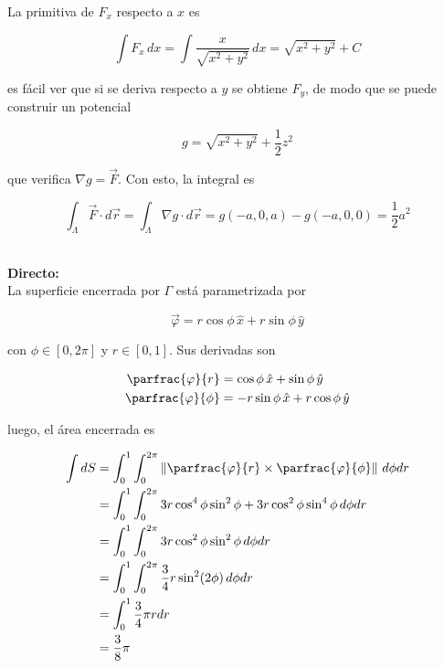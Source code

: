 La primitiva de $F_x$ respecto a $x$ es

\[\int F_x\,dx=\int\frac{x}{\sqrt{x^2+y^2}}\,dx=
\sqrt{x^2+y^2}+C\]

es fácil ver que si se deriva respecto a $y$ se obtiene $F_y$, de modo que se puede construir un potencial

\[g = \sqrt{x^2+y^2}+\frac{1}{2}z^2\]

que verifica $\nabla g=\Vec{F}$. Con esto, la integral es

\[\int_\Lambda\Vec{F}\cdot d\Vec{r}=
\int_\Lambda\nabla g\cdot d\Vec{r}=g(-a,0,a)-g(-a,0,0)=\frac{1}{2}a^2\]

\bigbreak
{}\\

\textbf{Directo:}\\

La superficie encerrada por $\Gamma$ está parametrizada por

\[\Vec{\varphi}= r\cos{\phi}\,\hat{x}
+r\sin{\phi}\,\hat{y}\]

con $\phi\in [0,2\pi]$ y $r\in [0,1]$. Sus derivadas son

\begin{equation}
\begin{split}
    \parfrac{\varphi}{r}&=\cos{\phi}\,\hat{x}
+\sin{\phi}\,\hat{y}\\
    \parfrac{\varphi}{\phi}&=-r\sin{\phi}\,\hat{x}
+r\cos{\phi}\,\hat{y}\\
\end{split}
\nonumber
\end{equation}

luego, el área encerrada es


\begin{equation}
\begin{split}
    \int dS &= \int^1_0\int^{2\pi}_0\left\|\parfrac{\varphi}{r}\times\parfrac{\varphi}{\phi}\right\|\,d\phi dr\\
    &= \int^1_0\int^{2\pi}_03r\cos^4\phi\sin^2\phi+
    3r\cos^2\phi\sin^4\phi\,d\phi dr\\
    &= \int^1_0\int^{2\pi}_03r\cos^2\phi\sin^2\phi\,d\phi dr\\
    &= \int^1_0\int^{2\pi}_0\frac{3}{4}r\sin^2(2\phi)\,d\phi dr\\
    &= \int^1_0\frac{3}{4}\pi r dr\\
    &= \frac{3}{8}\pi\\
\end{split}
\nonumber
\end{equation}

